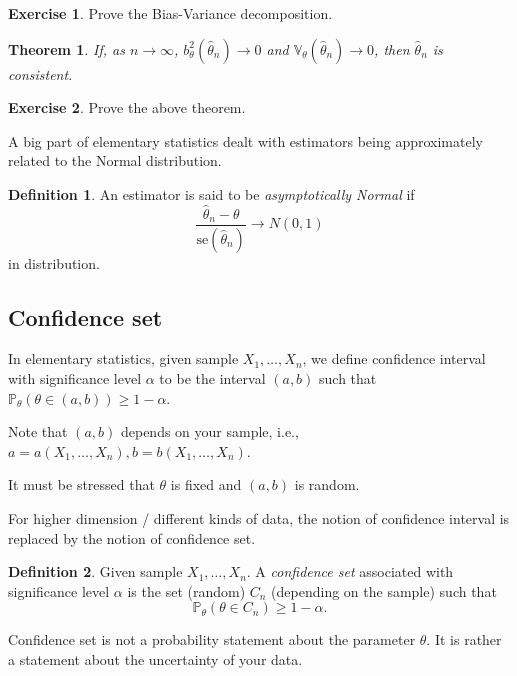 \documentclass[
  openany]{book}
\newtheorem{theorem}{Theorem}[chapter]
\theoremstyle{definition}
\newtheorem{definition}{Definition}[chapter]
\theoremstyle{definition}
\theoremstyle{definition}
\newtheorem{exercise}{Exercise}[chapter]
\theoremstyle{definition}
\theoremstyle{remark}
\begin{document}
\begin{exercise}
Prove the Bias-Variance decomposition.
\end{exercise}

\begin{theorem}
If, as \(n\to \infty\),
\(b_\theta^2(\hat \theta_n) \to 0\) and \(\mathbb{V}_\theta(\hat \theta_n) \to 0\),
then \(\hat\theta_n\) is consistent.
\end{theorem}

\begin{exercise}
Prove the above theorem.
\end{exercise}

A big part of elementary statistics dealt with estimators being approximately
related to the Normal distribution.

\begin{definition}
An estimator is said to be \emph{asymptotically Normal} if
\[ \frac{\hat \theta_n - \theta}{\mathrm{se}(\hat \theta_n)} \to N(0,1) \]
in distribution.
\end{definition}

\subsection{Confidence set}\label{confidence-set}

In elementary statistics,
given sample \(X_1, \dots, X_n\),
we define confidence interval with significance level \(\alpha\)
to be the interval \((a,b)\) such that \(\mathbb{P}_\theta( \theta \in (a,b) ) \geq 1 - \alpha\).

Note that \((a,b)\) depends on your sample, i.e.,
\(a = a(X_1, \dots, X_n), b = b(X_1, \dots, X_n)\).

It must be stressed that \(\theta\) is fixed and \((a,b)\) is random.

For higher dimension / different kinds of data, the notion of confidence interval
is replaced by the notion of confidence set.

\begin{definition}
Given sample \(X_1, \dots, X_n\).
A \emph{confidence set} associated with significance level \(\alpha\) is the set (random) \(C_n\) (depending on the sample)
such that
\[ \mathbb{P}_\theta(\theta \in C_n) \geq 1 - \alpha. \]
\end{definition}

Confidence set is not a probability statement about the parameter \(\theta\). It is
rather a statement about the uncertainty of your data.
\end{document}
